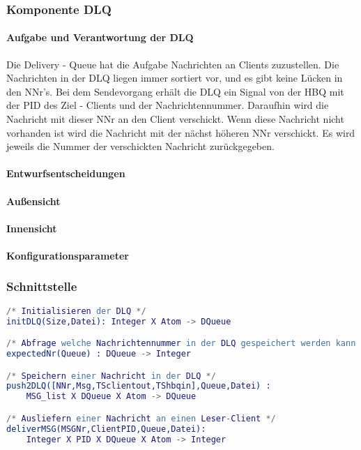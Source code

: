 \documentclass{article}
\begin{document}
		\subsubsection{Komponente DLQ}
			\paragraph{Aufgabe und Verantwortung der DLQ}
				Die Delivery - Queue hat die Aufgabe Nachrichten an Clients zuzustellen. 
				Die Nachrichten in der DLQ liegen immer sortiert vor, und es gibt keine Lücken in den NNr’s.
				Bei dem Sendevorgang erhält die DLQ ein Signal von der HBQ mit der PID des Ziel - Clients und der Nachrichtennummer. Daraufhin wird die Nachricht mit dieser NNr an den Client verschickt.
				Wenn diese Nachricht nicht vorhanden ist wird die Nachricht mit der nächst höheren NNr verschickt. 
				Es wird jeweils die Nummer der verschickten Nachricht zurückgegeben.
			\paragraph{Entwurfsentscheidungen}
			\paragraph{Außensicht}
			\paragraph{Innensicht}
			\paragraph{Konfigurationsparameter}
				

\subsubsection{Schnittstelle}
\begin{lstlisting}[language=erlang]
/* Initialisieren der DLQ */
initDLQ(Size,Datei): Integer X Atom -> DQueue

/* Abfrage welche Nachrichtennummer in der DLQ gespeichert werden kann */
expectedNr(Queue) : DQueue -> Integer

/* Speichern einer Nachricht in der DLQ */
push2DLQ([NNr,Msg,TSclientout,TShbqin],Queue,Datei) :
    MSG_list X DQueue X Atom -> DQueue

/* Ausliefern einer Nachricht an einen Leser-Client */
deliverMSG(MSGNr,ClientPID,Queue,Datei):
    Integer X PID X DQueue X Atom -> Integer
\end{lstlisting}
\end{document}
